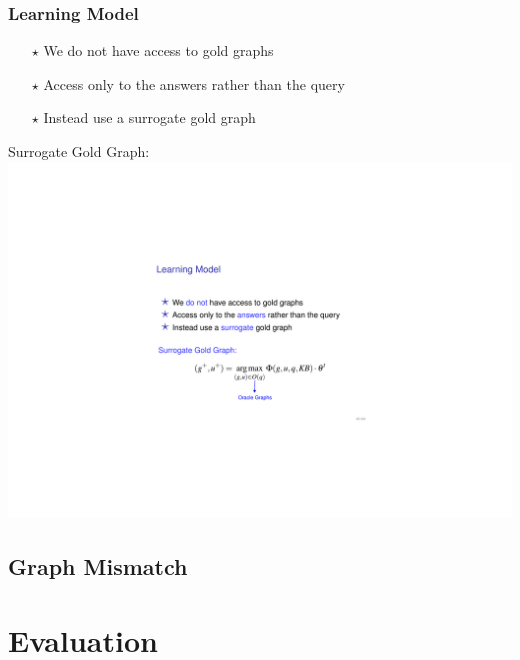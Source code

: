 \documentclass[mathserif,12pt]{beamer}
\newcommand{\hlight}[1]{{\color{blue!80} #1}}
\begin{document}
\begin{frame}
\frametitle{Learning Model}
\large 

\begin{itemize}
 \item[\huge $\star$] We \hlight{do not} have access to gold graphs
 \item[\huge $\star$] Access only to the \hlight{answers} rather than the query
 \item[\huge $\star$] Instead use a \hlight{surrogate} gold graph
\end{itemize}


\pause
\vspace{0.5cm}
\hlight{Surrogate Gold Graph: }
\includegraphics{figures/perceptron-oracle}

\end{frame}

\subsection{Graph Mismatch}

\section{Evaluation} 
\end{document}
